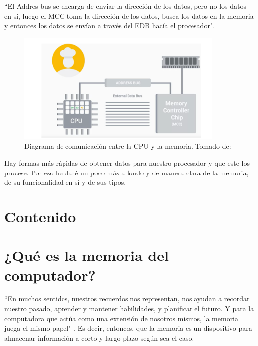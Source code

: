 \documentclass{article}
\begin{document}
 ``El Addres bus se encarga de enviar la dirección de los datos, pero no los datos en sí, luego el MCC toma la dirección de los datos, busca los datos en la memoria y entonces los datos se envían a través del EDB hacía el procesador"\cite[Programs and hardware. 5:51]{Coursera}.

\begin{figure}[h]
\includegraphics[width=10cm]{Captura.1.PNG}
\centering
\caption{Diagrama de comunicación entre la CPU y la memoria. Tomado de:\cite{Coursera}}
\label{Captura.1.PNG}
\end{figure}
Hay formas más rápidas de obtener datos para nuestro procesador y que este los procese. Por eso hablaré un poco más a fondo y de manera clara de la memoria, de su funcionalidad en sí y de sus tipos. 

\section{Contenido} \label{contenido}

\section{¿Qué es la memoria del computador?}
 ``En muchos sentidos, nuestros recuerdos nos representan, nos ayudan a recordar nuestro pasado, aprender y mantener habilidades, y planificar el futuro. Y para la computadora que actúa como una extensión de nosotros mismos, la memoria juega el mismo papel"\cite[How computer memory works. 00:06]{TEDwebsite} . Es decir, entonces, que la memoria es un dispositivo para almacenar información a corto y largo plazo según sea el caso. 
\vspace{0.2cm}
\end{document}
